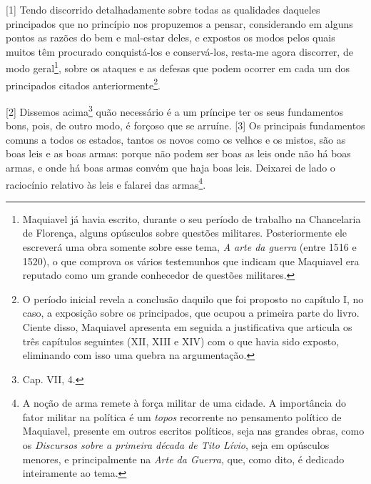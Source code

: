 {[}1{]} Tendo discorrido detalhadamente sobre todas as qualidades
daqueles principados que no princípio nos propuzemos a pensar,
considerando em alguns pontos as razões do bem e mal-estar deles, e
expostos os modos pelos quais muitos têm procurado conquistá-los e
conservá-los, resta-me agora discorrer, de modo geral\footnote{Maquiavel
  já havia escrito, durante o seu período de trabalho na Chancelaria de
  Florença, alguns opúsculos sobre questões militares. Posteriormente
  ele escreverá uma obra somente sobre esse tema, \emph{A arte da
  guerra} (entre 1516 e 1520), o que comprova os vários testemunhos que
  indicam que Maquiavel era reputado como um grande conhecedor de
  questões militares.}, sobre os ataques e as defesas que podem ocorrer
em cada um dos principados citados anteriormente\footnote{O período
  inicial revela a conclusão daquilo que foi proposto no capítulo I, no
  caso, a exposição sobre os principados, que ocupou a primeira parte do
  livro. Ciente disso, Maquiavel apresenta em seguida a justificativa
  que articula os três capítulos seguintes (XII, XIII e XIV) com o que
  havia sido exposto, eliminando com isso uma quebra na argumentação.}.

{[}2{]} Dissemos acima\footnote{Cap. VII, 4.} quão necessário é a um
príncipe ter os seus fundamentos bons, pois, de outro modo, é forçoso
que se arruíne. {[}3{]} Os principais fundamentos comuns a todos os
estados, tantos os novos como os velhos e os mistos, são as boas leis e
as boas armas: porque não podem ser boas as leis onde não há boas armas,
e onde há boas armas convém que haja boas leis. Deixarei de lado o
raciocínio relativo às leis e falarei das armas\footnote{A noção de arma
  remete à força militar de uma cidade. A importância do fator militar
  na política é um \emph{topos} recorrente no pensamento político de
  Maquiavel, presente em outros escritos políticos, seja nas grandes
  obras, como os \emph{Discursos sobre a primeira década de Tito Lívio},
  seja em opúsculos menores, e principalmente na \emph{Arte da Guerra},
  que, como dito, é dedicado inteiramente ao tema.}.

